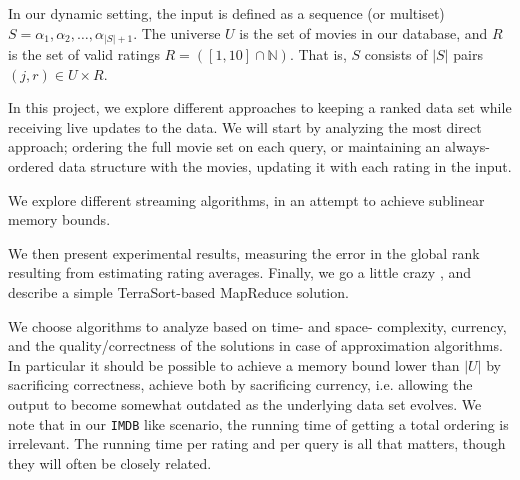 \documentclass[a4paper, titlepage]{report}
\renewcommand{\%}{\scalebox{.9}{\oldpct}}
\begin{document}
In our dynamic setting, the input is defined as a sequence (or multiset) $S =
\alpha_1, \alpha_2,\ldots,\alpha_{|S|+1}$. The universe $U$ is the set of movies
in our database, and $R$ is the set of valid ratings $R =
\left(\left[1,10\right]\cap \mathbb{N}\right)$. That is, $S$ consists of $|S|$
pairs $(j,r)\in U \times R$.

In this project, we explore different approaches to keeping a ranked data set
while receiving live updates to the data. We will start by analyzing the most
direct approach; ordering the full movie set on each query, or maintaining an
always-ordered data structure with the movies, updating it with each rating in
the input.

We explore different streaming algorithms, in an attempt to achieve sublinear
memory bounds.

We then present experimental results, measuring the error in the
global rank resulting from estimating rating averages. Finally, we go a little
crazy \footnotemark
, and describe a simple TerraSort-based MapReduce solution.


We choose algorithms to analyze based on time- and space- complexity, currency,
and the quality/correctness of the solutions in case of approximation
algorithms.
In particular it should be possible to achieve a memory bound lower than $|U|$ by
sacrificing correctness, achieve both by sacrificing currency, i.e. allowing the
output to become somewhat outdated as the underlying data set evolves. We note
that in our \texttt{IMDB} like scenario, the running time of getting a total
ordering is irrelevant. The running time per rating and per query is all that
matters, though they will often be closely related. 
\end{document}
